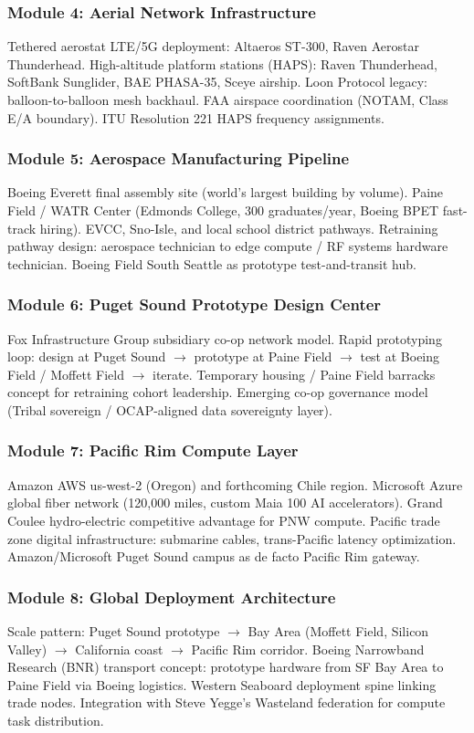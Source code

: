 \documentclass[11pt,letterpaper]{article}
\begin{document}
\subsubsection{Module 4: Aerial Network Infrastructure}
Tethered aerostat LTE/5G deployment: Altaeros ST-300, Raven Aerostar Thunderhead. High-altitude platform stations (HAPS): Raven Thunderhead, SoftBank Sunglider, BAE PHASA-35, Sceye airship. Loon Protocol legacy: balloon-to-balloon mesh backhaul. FAA airspace coordination (NOTAM, Class E/A boundary). ITU Resolution 221 HAPS frequency assignments.

\subsubsection{Module 5: Aerospace Manufacturing Pipeline}
Boeing Everett final assembly site (world's largest building by volume). Paine Field / WATR Center (Edmonds College, 300 graduates/year, Boeing BPET fast-track hiring). EVCC, Sno-Isle, and local school district pathways. Retraining pathway design: aerospace technician to edge compute / RF systems hardware technician. Boeing Field South Seattle as prototype test-and-transit hub.

\subsubsection{Module 6: Puget Sound Prototype Design Center}
Fox Infrastructure Group subsidiary co-op network model. Rapid prototyping loop: design at Puget Sound $\to$ prototype at Paine Field $\to$ test at Boeing Field / Moffett Field $\to$ iterate. Temporary housing / Paine Field barracks concept for retraining cohort leadership. Emerging co-op governance model (Tribal sovereign / OCAP-aligned data sovereignty layer).

\subsubsection{Module 7: Pacific Rim Compute Layer}
Amazon AWS us-west-2 (Oregon) and forthcoming Chile region. Microsoft Azure global fiber network (120,000 miles, custom Maia 100 AI accelerators). Grand Coulee hydro-electric competitive advantage for PNW compute. Pacific trade zone digital infrastructure: submarine cables, trans-Pacific latency optimization. Amazon/Microsoft Puget Sound campus as de facto Pacific Rim gateway.

\subsubsection{Module 8: Global Deployment Architecture}
Scale pattern: Puget Sound prototype $\to$ Bay Area (Moffett Field, Silicon Valley) $\to$ California coast $\to$ Pacific Rim corridor. Boeing Narrowband Research (BNR) transport concept: prototype hardware from SF Bay Area to Paine Field via Boeing logistics. Western Seaboard deployment spine linking trade nodes. Integration with Steve Yegge's Wasteland federation for compute task distribution.
\end{document}
